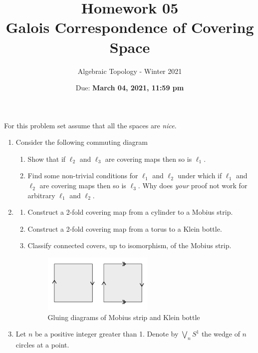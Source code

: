 \documentclass{article}
\title{Homework 05 \\ Galois Correspondence of Covering Space}
\author{Algebraic Topology - Winter 2021}
\date{Due: \textbf{March 04, 2021, 11:59 pm}}
\begin{document}
\maketitle

For this problem set assume that all the spaces are \textit{nice}.
\begin{enumerate}
\item 
  Consider the following commuting diagram
  \begin{center}
  \end{center}
  \begin{enumerate}
  \item Show that if $\ell_2$ and $\ell_3$ are covering maps then so is $\ell_1$. 
  \item Find some non-trivial conditions for $\ell_1$ and $\ell_2$ under which if $\ell_1$ and $\ell_2$ are covering
    maps then so is $\ell_3$. Why does \textit{your} proof not work for
    arbitrary $\ell_1$ and $\ell_2$.
  \end{enumerate}
\item 
  \begin{enumerate}
    \item Construct a 2-fold covering map from a cylinder to a Mobius strip.
  \item Construct a 2-fold covering map from a torus to a Klein bottle.
  \item Classify connected covers, up to isomorphism, of the Mobius strip.
    \begin{figure}[H]
      \centering
      \includegraphics[width=150pt]{images/mobius+klein.png} 
      \caption{Gluing diagrams of Mobius strip and Klein bottle}
      \label{fig:klein_bottle}
    \end{figure}
  \end{enumerate}
\item
  Let $n$ be a positive integer greater than 1. Denote by $\bigvee
  _{n}S^1$ the wedge of $n$ circles at a point. 

\end{enumerate}
\end{document}
